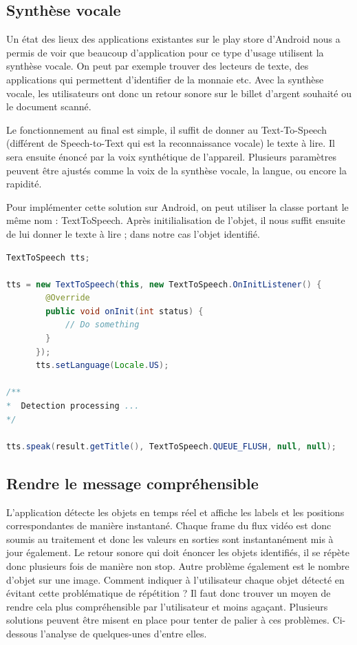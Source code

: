 \documentclass[UTF8]{EPURapport}
\begin{document}
\subsection{Synthèse vocale}
Un état des lieux des applications existantes sur le play store d'Android nous a permis de voir que beaucoup d'application pour ce type d'usage utilisent la synthèse vocale. On peut par exemple trouver des lecteurs de texte, des applications qui permettent d'identifier de la monnaie etc. Avec la synthèse vocale, les utilisateurs ont donc un retour sonore sur le billet d'argent souhaité ou le document scanné.

Le fonctionnement au final est simple, il suffit de donner au Text-To-Speech (différent de Speech-to-Text qui est la reconnaissance vocale) le texte à lire. Il sera ensuite énoncé par la voix synthétique de l'appareil. Plusieurs paramètres peuvent être ajustés comme la voix de la synthèse vocale, la langue, ou encore la rapidité.

Pour implémenter cette solution sur Android, on peut utiliser la classe portant le même nom : TextToSpeech. Après initilialisation de l'objet, il nous suffit ensuite de lui donner le texte à lire ; dans notre cas l'objet identifié. \\

\begin{lstlisting}[language=Java]
TextToSpeech tts;

tts = new TextToSpeech(this, new TextToSpeech.OnInitListener() {
        @Override
        public void onInit(int status) {
    		// Do something
        }
      });
      tts.setLanguage(Locale.US);

/**
*  Detection processing ...
*/

tts.speak(result.getTitle(), TextToSpeech.QUEUE_FLUSH, null, null);
\end{lstlisting}

\subsection{Rendre le message compréhensible}
L'application détecte les objets en temps réel et affiche les labels et les positions correspondantes de manière instantané. Chaque frame du flux vidéo est donc soumis au traitement et donc les valeurs en sorties sont instantanément mis à jour également. Le retour sonore qui doit énoncer les objets identifiés, il se répète donc plusieurs fois de manière non stop. Autre problème également est le nombre d'objet sur une image. Comment indiquer à l'utilisateur chaque objet détecté en évitant cette problématique de répétition ? Il faut donc trouver un moyen de rendre cela plus compréhensible par l'utilisateur et moins agaçant. Plusieurs solutions peuvent être misent en place pour tenter de palier à ces problèmes. Ci-dessous l'analyse de quelques-unes d'entre elles. 
\end{document}
